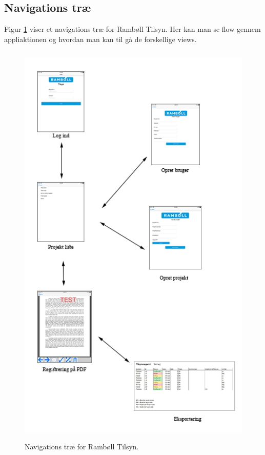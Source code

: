 \subsection{Navigations træ}
Figur \ref{fig:Navi} viser et navigations træ for Rambøll Tilsyn. Her kan man se flow gennem appliaktionen og hvordan man kan til gå de forskellige views.

\begin{figure}[H] %
	\centering
	\includegraphics[height=20cm, width=12cm]{../ArkitekturDesign/Design/Navigation/Navigation}
	\caption{Navigations træ for Rambøll Tilsyn.}
	\label{fig:Navi}
\end{figure}

\clearpage